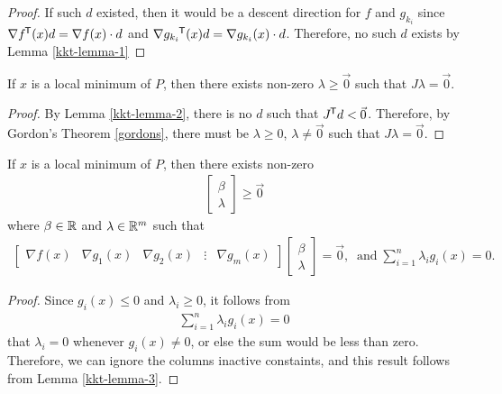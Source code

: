 \begin{proof}
    If such $d$ existed, then it would be a descent direction for $f$ and $g_{k_i}$ since $\nabla {f}^{\mkern-1.5mu\mathsf{T}}(x)d = \nabla f(x) \cdot d$ and $\nabla {g_{k_i}}^{\mkern-1.5mu\mathsf{T}}(x)d = \nabla g_{k_i}(x) \cdot d$. Therefore, no such $d$ exists by Lemma \ref{kkt-lemma-1}
\end{proof}

\begin{lemma}\label{kkt-lemma-3}
    If $x$ is a local minimum of $P$, then there exists non-zero $\lambda \geq \vec{0}$ such that $J\lambda = \vec{0}$.
\end{lemma}

\begin{proof}
    By Lemma \ref{kkt-lemma-2}, there is no $d$ such that ${J}^{\mkern-1.5mu\mathsf{T}}d < \vec{0}$. Therefore, by Gordon's Theorem \ref{gordons}, there must be $\lambda \geq 0$, $\lambda \neq \vec{0}$ such that $J\lambda = \vec{0}$.
\end{proof}

\begin{lemma}\label{kkt-lemma-4}
    If $x$ is a local minimum of $P$, then there exists non-zero
    \begin{align*}
        \begin{bmatrix}
            \beta \\ \lambda
        \end{bmatrix} \geq \vec{0}
    \end{align*}
    where $\beta \in \mathbb{R}$ and $\lambda \in \mathbb{R}^m$ such that
    \begin{align*}
        \left[\begin{array}{c|c|c|c|c}
            \nabla f(x) & \nabla g_1(x) & \nabla g_2(x) & \vdots & \nabla g_m(x)
        \end{array}\right]\begin{bmatrix}
            \beta \\ \lambda
        \end{bmatrix} = \vec{0},\;\;\textrm{and}\;\sum_{i=1}^{n}\lambda_ig_i(x) = 0.
    \end{align*}
\end{lemma}

\begin{proof}
    Since $g_i(x) \leq 0$ and $\lambda_i \geq 0$, it follows from
    \begin{align*}
        \sum_{i=1}^{n}\lambda_ig_i(x) = 0
    \end{align*}
    that $\lambda_i = 0$ whenever $g_i(x) \neq 0$, or else the sum would be less than zero. Therefore, we can ignore the columns inactive constaints, and this result follows from Lemma \ref{kkt-lemma-3}.
\end{proof}

